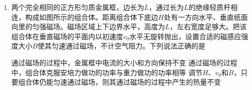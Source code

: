 \documentclass[\gkver]{gaokaozhenti}
\begin{document}
\begin{enumerate}
{	经过计算有

	$E_{x} = \frac{W}{2qR}$，$E_{y} = \frac{\sqrt{3}W}{2qR}$，$E = \frac{W}{qR}$，$\tan\theta = \frac{E_{y}}{E_{x}} = \sqrt{3}$

	由于电场方向与水平方向成$60^{\circ}$，则电场与$ab$平行，且沿$a$指向$b$，A 正确；

	B．该粒子从$d$点运动到$b$点，电场力做的功为

	$W' = Eq \frac{R}{2} = 0.5W$

	B 正确；

	C．沿电场线方向电势逐渐降低，则$a$点的电势高于$c$点的电势，C 错误；

	D．若粒子的初速度方向与$ab$平行则粒子做匀变速直线运动，D 错误。

	故选 AB。
}

\item
两个完全相同的正方形匀质金属框，边长为$L$，通过长为$L$的绝缘轻质杆相连，构成如图所示的组合体。距离组合体下底边$H$处有一方向水平、垂直纸面向里的匀强磁场。磁场区域上下边界水平，高度为$L$，左右宽度足够大。把该组合体在垂直磁场的平面内以初速度$v_{0}$水平无旋转抛出，设置合适的磁感应强度大小$B$使其匀速通过磁场，不计空气阻力。下列说法正确的是 


{通过磁场的过程中，金属框中电流的大小和方向保持不变}
{通过磁场的过程中，组合体克服安培力做功的功率与重力做功的功率相等}
{调节$H$、$v_{0}$和$B$，只要组合体仍能匀速通过磁场，则其通过磁场的过程中产生的热量不变}

\end{enumerate}
\end{document}
